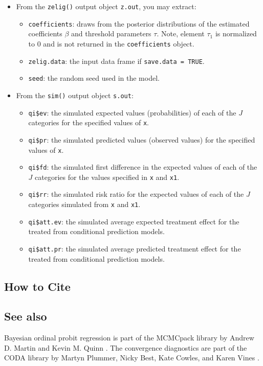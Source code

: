 \begin{itemize}
\item From the \texttt{zelig()} output object \texttt{z.out}, you may extract:

\begin{itemize}
\item \texttt{coefficients}: draws from the posterior distributions
of the estimated coefficients $\beta$ and threshold parameters $\tau$.
Note, element $\tau_1$ is normalized to 0 and is not returned in the 
\texttt{coefficients} object.

   \item {\tt zelig.data}: the input data frame if {\tt save.data = TRUE}.  
\item \texttt{seed}: the random seed used in the model.

\end{itemize}

\item From the \texttt{sim()} output object \texttt{s.out}:

\begin{itemize}
\item \texttt{qi\$ev}: the simulated expected values (probabilities) of 
each of the $J$ categories for the specified values of \texttt{x}.

\item \texttt{qi\$pr}: the simulated predicted values (observed values)
 for the specified values of \texttt{x}.

\item \texttt{qi\$fd}: the simulated first difference in the expected
values of each of the $J$ categories for the values specified in 
\texttt{x} and \texttt{x1}.

\item \texttt{qi\$rr}: the simulated risk ratio for the 
expected values of each of the $J$ categories simulated 
from \texttt{x} and \texttt{x1}.

\item \texttt{qi\$att.ev}: the simulated average expected treatment effect
for the treated from conditional prediction models.

\item \texttt{qi\$att.pr}: the simulated average predicted treatment effect
for the treated from conditional prediction models.
\end{itemize}
\end{itemize}


\subsection*{How to Cite}


\subsection*{See also}
Bayesian ordinal probit regression is part of the MCMCpack library by Andrew D. Martin and Kevin M. Quinn \citep{MarQui05}.
The convergence diagnostics are part of the CODA library by Martyn Plummer, Nicky Best, Kate Cowles, and Karen Vines \citep{PluBesCowVin05}.
